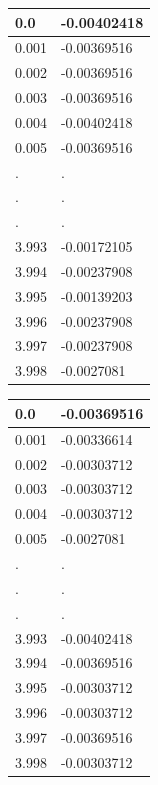 \documentclass[a4paper, 12pt]{article}
\begin{document}
\begin{center}
\begin{tabular}{|l|l|}\hline
0.0&-0.00402418\\ \hline
0.001&-0.00369516\\ \hline
0.002&-0.00369516\\ \hline
0.003&-0.00369516\\ \hline
0.004&-0.00402418\\ \hline
0.005&-0.00369516\\ \hline
.&.\\
.&.\\
.&.\\
3.993&-0.00172105\\ \hline
3.994&-0.00237908\\ \hline
3.995&-0.00139203\\ \hline
3.996&-0.00237908\\ \hline
3.997&-0.00237908\\ \hline
3.998&-0.0027081\\ \hline
	\end{tabular}
\end{center}
\newpage
\begin{center}
\begin{tabular}{|l|l|}\hline
0.0&-0.00369516\\ \hline
0.001&-0.00336614\\ \hline
0.002&-0.00303712\\ \hline
0.003&-0.00303712\\ \hline
0.004&-0.00303712\\ \hline
0.005&-0.0027081\\ \hline
.&.\\
.&.\\
.&.\\
3.993&-0.00402418\\ \hline
3.994&-0.00369516\\ \hline
3.995&-0.00303712\\ \hline
3.996&-0.00303712\\ \hline
3.997&-0.00369516\\ \hline
3.998&-0.00303712\\ \hline
	\end{tabular}
\end{center}
\end{document}
